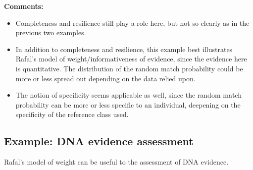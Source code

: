 \documentclass[
  10pt,
  dvipsnames,enabledeprecatedfontcommands]{scrartcl}
\providecommand{\tightlist}{%
  \setlength{\itemsep}{0pt}\setlength{\parskip}{0pt}}
\begin{document}
\textbf{Comments:}

\begin{itemize}
\tightlist
\item
  Completeness and resilience still play a role here, but not so clearly
  as in the previous two examples.
\end{itemize}


\begin{itemize}
\tightlist
\item
  In addition to completeness and resilience, this example best
  illustrates Rafal's model of weight/informativeness of evidence, since
  the evidence here is quantitative. The distribution of the random
  match probability could be more or less spread out depending on the
  data relied upon.
\end{itemize}


\begin{itemize}
\tightlist
\item
  The notion of specificity seems applicable as well, since the random
  match probability can be more or less specific to an individual,
  deepening on the specificity of the reference class used.
\end{itemize}


\hypertarget{example-dna-evidence-assessment}{%
\subsection{Example: DNA evidence
assessment}\label{example-dna-evidence-assessment}}

Rafal's model of weight can be useful to the assessment of DNA evidence.
\end{document}
